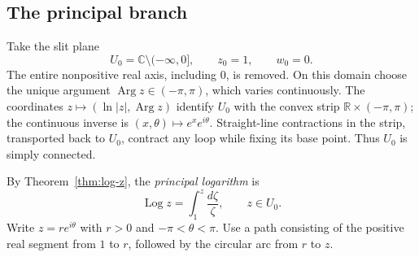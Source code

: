 \documentclass[11pt]{article}
\theoremstyle{plain}
\theoremstyle{definition}
\theoremstyle{remark}
\numberwithin{equation}{section}
\newcommand{\C}{\mathbb{C}}
\newcommand{\R}{\mathbb{R}}
\DeclareMathOperator{\Log}{Log}
\DeclareMathOperator{\Arg}{Arg}
\begin{document}
\begin{center}
\end{center}

\subsection{The principal branch}
Take the slit plane
\[
 U_0=\C\setminus(-\infty,0],\qquad z_0=1,\qquad w_0=0.
\]
The entire nonpositive real axis, including $0$, is removed. On this
domain choose the unique argument $\Arg z\in(-\pi,\pi)$, which varies
continuously. The coordinates $z\mapsto(\ln|z|,\Arg z)$ identify $U_0$
with the convex strip $\R\times(-\pi,\pi)$; the continuous inverse is
$(x,\theta)\mapsto e^x e^{i\theta}$. Straight-line contractions in the
strip, transported back to $U_0$, contract any loop while fixing its
base point. Thus $U_0$ is simply connected.

By Theorem~\ref{thm:log-z}, the \emph{principal logarithm} is
\[
 \Log z=\int_1^z\frac{d\zeta}{\zeta},\qquad z\in U_0.
\]
Write $z=re^{i\theta}$ with $r>0$ and $-\pi<\theta<\pi$.
Use a path consisting of the positive real segment from $1$ to $r$,
followed by the circular arc from $r$ to $z$.
\end{document}
